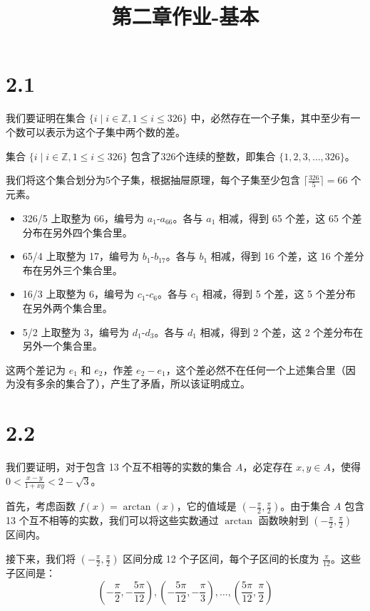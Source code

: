 \documentclass{article}
\title{第二章作业-基本}
\begin{document}
\begin{CJK}{UTF8}{gbsn}
\date{}

\maketitle

\section*{2.1}
我们要证明在集合 $\{i \mid i \in \mathbb{Z}, 1 \leq i \leq 326\}$ 中，必然存在一个子集，其中至少有一个数可以表示为这个子集中两个数的差。

集合 $\{i \mid i \in \mathbb{Z}, 1 \leq i \leq 326\}$ 包含了326个连续的整数，即集合 $\{1, 2, 3, \ldots, 326\}$。

我们将这个集合划分为5个子集，根据抽屉原理，每个子集至少包含 $\lceil \frac{326}{5} \rceil = 66$ 个元素。


\begin{itemize}
    \item 326/5 上取整为 66，编号为 $a_1$-$a_{66}$。各与 $a_1$ 相减，得到 65 个差，这 65 个差分布在另外四个集合里。
    \item 65/4 上取整为 17，编号为 $b_1$-$b_{17}$。各与 $b_1$ 相减，得到 16 个差，这 16 个差分布在另外三个集合里。
    \item 16/3 上取整为 6，编号为 $c_1$-$c_6$。各与 $c_1$ 相减，得到 5 个差，这 5 个差分布在另外两个集合里。
    \item 5/2 上取整为 3，编号为 $d_1$-$d_3$。各与 $d_1$ 相减，得到 2 个差，这 2 个差分布在另外一个集合里。
\end{itemize}

这两个差记为 $e_1$ 和 $e_2$，作差 $e_2 - e_1$，这个差必然不在任何一个上述集合里（因为没有多余的集合了），产生了矛盾，所以该证明成立。

\section*{2.2}
我们要证明，对于包含 13 个互不相等的实数的集合 \( A \)，必定存在 \( x, y \in A \)，使得 \( 0 < \frac{x - y}{1 + xy} < 2 - \sqrt{3} \)。

首先，考虑函数 \( f(x) = \arctan(x) \)，它的值域是 \( \left( -\frac{\pi}{2}, \frac{\pi}{2} \right) \)。由于集合 \( A \) 包含 13 个互不相等的实数，我们可以将这些实数通过 \( \arctan \) 函数映射到 \( \left( -\frac{\pi}{2}, \frac{\pi}{2} \right) \) 区间内。

接下来，我们将 \( \left( -\frac{\pi}{2}, \frac{\pi}{2} \right) \) 区间分成 12 个子区间，每个子区间的长度为 \( \frac{\pi}{12} \)。这些子区间是：
\[
\left( -\frac{\pi}{2}, -\frac{5\pi}{12} \right), \left( -\frac{5\pi}{12}, -\frac{\pi}{3} \right), \ldots, \left( \frac{5\pi}{12}, \frac{\pi}{2} \right)
\]


\end{CJK}
\end{document}
